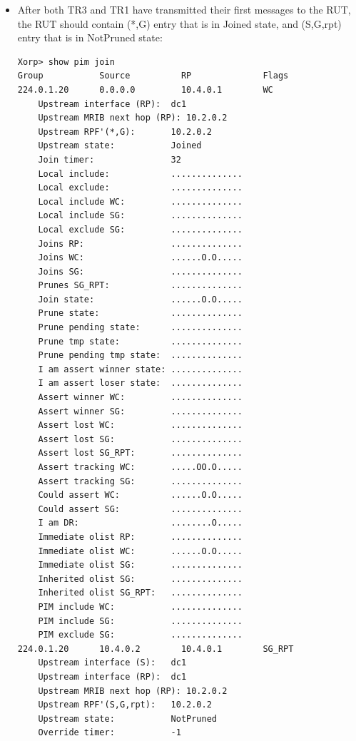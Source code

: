 \documentclass[11pt]{report}
\begin{document}

\begin{itemize}

  \item After both TR3 and TR1 have transmitted their first messages to the
  RUT, the RUT should contain (*,G) entry that is in Joined state, and
  (S,G,rpt) entry that is in NotPruned state:

\begin{verbatim}
Xorp> show pim join 
Group           Source          RP              Flags
224.0.1.20      0.0.0.0         10.4.0.1        WC   
    Upstream interface (RP):  dc1
    Upstream MRIB next hop (RP): 10.2.0.2
    Upstream RPF'(*,G):       10.2.0.2
    Upstream state:           Joined 
    Join timer:               32
    Local include:            ..............
    Local exclude:            ..............
    Local include WC:         ..............
    Local include SG:         ..............
    Local exclude SG:         ..............
    Joins RP:                 ..............
    Joins WC:                 ......O.O.....
    Joins SG:                 ..............
    Prunes SG_RPT:            ..............
    Join state:               ......O.O.....
    Prune state:              ..............
    Prune pending state:      ..............
    Prune tmp state:          ..............
    Prune pending tmp state:  ..............
    I am assert winner state: ..............
    I am assert loser state:  ..............
    Assert winner WC:         ..............
    Assert winner SG:         ..............
    Assert lost WC:           ..............
    Assert lost SG:           ..............
    Assert lost SG_RPT:       ..............
    Assert tracking WC:       .....OO.O.....
    Assert tracking SG:       ..............
    Could assert WC:          ......O.O.....
    Could assert SG:          ..............
    I am DR:                  ........O.....
    Immediate olist RP:       ..............
    Immediate olist WC:       ......O.O.....
    Immediate olist SG:       ..............
    Inherited olist SG:       ..............
    Inherited olist SG_RPT:   ..............
    PIM include WC:           ..............
    PIM include SG:           ..............
    PIM exclude SG:           ..............
224.0.1.20      10.4.0.2        10.4.0.1        SG_RPT 
    Upstream interface (S):   dc1
    Upstream interface (RP):  dc1
    Upstream MRIB next hop (RP): 10.2.0.2
    Upstream RPF'(S,G,rpt):   10.2.0.2
    Upstream state:           NotPruned 
    Override timer:           -1

\end{verbatim}
\end{itemize}
\end{document}
